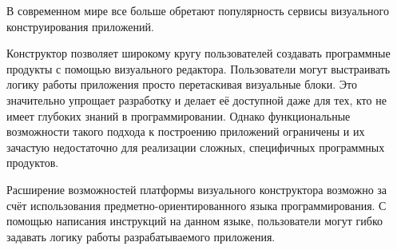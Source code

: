 

В современном мире все больше обретают популярность сервисы
визуального конструирования приложений.

Конструктор позволяет широкому кругу пользователей создавать программные продукты с помощью визуального редактора.
Пользователи могут выстраивать логику работы приложения просто перетаскивая визуальные блоки.
Это значительно упрощает разработку и делает её доступной даже для тех, кто не имеет глубоких знаний в программировании.
Однако функциональные возможности такого подхода к построению приложений ограничены и
их зачастую недостаточно для реализации сложных, специфичных программных продуктов.

Расширение возможностей платформы визуального конструктора возможно
за счёт использования предметно-ориентированного языка программирования.
С помощью написания инструкций на данном языке, пользователи  могут гибко задавать логику
работы разрабатываемого приложения.

\pagebreak
